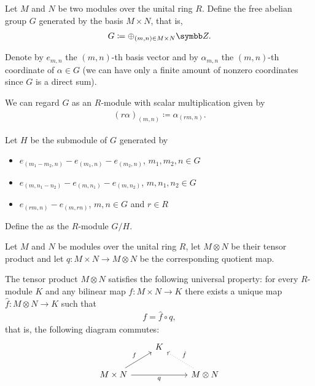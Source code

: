 \begin{definition}\label{def:module_tensor_product}\cite[574]{Knapp2016BAlg}
  Let \( M \) and \( N \) be two modules over the unital ring \( R \). Define the free abelian group \( G \) generated by the basis \( M \times N \), that is,
  \begin{align*}
    G \coloneqq \oplus_{(m,n) \in M \times N} \BB{Z}.
  \end{align*}

  Denote by \( e_{m,n} \) the \( (m,n) \)-th basis vector and by \( \alpha_{m,n} \) the \( (m,n) \)-th coordinate of \( \alpha \in G \) (we can have only a finite amount of nonzero coordinates since \( G \) is a direct sum).

  We can regard \( G \) as an \( R \)-module with scalar multiplication given by
  \begin{align*}
    (r \alpha)_{(m,n)} \coloneqq \alpha_{(rm,n)}.
  \end{align*}

  Let \( H \) be the submodule of \( G \) generated by
  \begin{itemize}
    \item \( e_{(m_1 - m_2, n)} - e_{(m_1,n)} - e_{(m_2,n)} \), \( m_1, m_2, n \in G \)
    \item \( e_{(m, n_1 - n_2)} - e_{(m,n_1)} - e_{(m,n_2)} \), \( m, n_1, n_2 \in G \)
    \item \( e_{(rm,n)} - e_{(m,rn)} \), \( m, n \in G \) and \( r \in R \)
  \end{itemize}

  Define the  as the \( R \)-module \( G / H \).
\end{definition}

\begin{theorem}\label{thm:tensor_product_universal_property}\cite[theorem 10.18]{Knapp2016BAlg}
  Let \( M \) and \( N \) be modules over the unital ring \( R \), let \( M \otimes N \) be their tensor product and let \( q: M \times N \to M \otimes N \) be the corresponding quotient map.

  The tensor product \( M \otimes N \) satisfies the following universal property: for every \( R \)-module \( K \) and any bilinear map \( f: M \times N \to K \) there exists a unique map \( \hat f: M \otimes N \to K \) such that
  \begin{align*}
    f = \hat f \circ q,
  \end{align*}
  that is, the following diagram commutes:
  \begin{equation}\label{thm:tensor_product_universal_property/diagram}
    \begin{tikzcd}[baseline=(current bounding box.center)]
                                                  & K & \\
      M \times N \arrow[ru, "f"] \arrow[rr, "q"'] &   & M \otimes N \arrow[lu, "\hat f"', dotted]
    \end{tikzcd}
  \end{equation}
\end{theorem}
